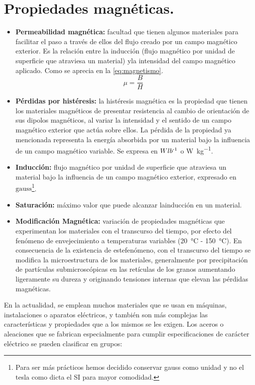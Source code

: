 \documentclass[12pt,a4paper]{article}
\begin{document}
\section{Propiedades magnéticas.}
\begin{itemize}
    \item \textbf{Permeabilidad magnética:} facultad que tienen algunos materiales para facilitar el paso a través de ellos del flujo creado por un campo magnético exterior. Es la relación entre la inducción (flujo magnético por unidad de superficie que atraviesa un material) yla intensidad del campo magnético aplicado. Como se aprecia en la \autoref{eq:magnetismo}.
    \begin{equation} \label{eq:magnetismo}
        \mu  = \frac{B}{H}
    \end{equation}
    \item \textbf{Pérdidas por histéresis:} la histéresis magnética es la propiedad que tienen los materiales magnéticos de presentar resistencia al cambio de orientación de sus dipolos magnéticos, al variar la intensidad y el sentido de un campo magnético exterior que actúa sobre ellos. La pérdida de la propiedad ya mencionada representa la energía absorbida por un material bajo la influencia de un campo magnético variable. Se expresa en $Wlb\textsuperscript{-1}$ o \si{\watt\per\kilogram}.
    \item \textbf{Inducción:} flujo magnético por unidad de superficie que atraviesa un material bajo la influencia de un campo magnético exterior, expresado en $\mathrm{gauss}$\footnote{Para ser más prácticos hemos decidido conservar gauss como unidad y no el tesla como dicta el SI para mayor comodidad.}.
    \item \textbf{Saturación:} máximo valor que puede alcanzar lainducción en un material.
    \item \textbf{Modificación Magnética:} variación de propiedades magnéticas que experimentan los materiales con el transcurso del tiempo, por efecto del fenómeno de envejecimiento a temperaturas variables (\SI{20}{\celsius} - \SI{150}{\celsius}). En consecuencia de la existencia de estefenómeno, con el transcurso del tiempo se modifica la microestructura de los materiales, generalmente por precipitación de partículas submicroscópicas en las retículas de los granos aumentando ligeramente su dureza y originando tensiones internas que elevan las  pérdidas magnéticas.
\end{itemize}

En la actualidad, se emplean muchos materiales que se usan en máquinas, instalaciones o aparatos eléctricos, y también son más complejas las características y propiedades que a los mismos se les exigen.
Los aceros o aleaciones que se fabrican especialmente para cumplir especificaciones de carácter eléctrico se pueden clasificar en grupos:
\end{document}
